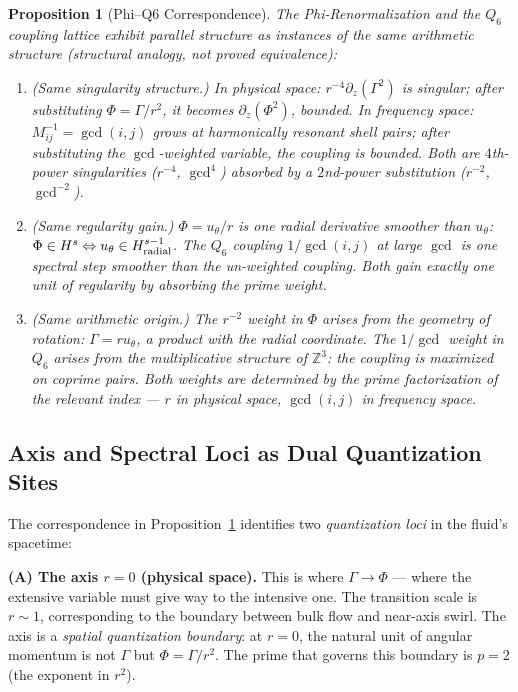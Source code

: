 \documentclass[11pt]{article}
\newtheorem{proposition}[theorem]{Proposition}
\begin{document}
\begin{proposition}[Phi--Q6 Correspondence]\label{prop:correspondence}
The Phi-Renormalization and the $Q_6$ coupling lattice exhibit parallel structure
as instances of the same arithmetic structure (structural analogy, not proved equivalence):
\begin{enumerate}[label=(\roman*)]
\item \textup{(Same singularity structure.)}
  In physical space: $r^{-4}\partial_z(\Gamma^2)$ is singular;
  after substituting $\Phi=\Gamma/r^2$, it becomes $\partial_z(\Phi^2)$, bounded.
  In frequency space: $M_{ij}^{-1}=\gcd(i,j)$ grows at harmonically
  resonant shell pairs; after substituting the $\gcd$-weighted variable,
  the coupling is bounded.
  Both are $4$th-power singularities ($r^{-4}$, $\gcd^4$) absorbed by a
  $2$nd-power substitution ($r^{-2}$, $\gcd^{-2}$).

\item \textup{(Same regularity gain.)}
  $\Phi=u_\theta/r$ is one radial derivative smoother than $u_\theta$:
  $\Phi\in H^s \Leftrightarrow u_\theta\in H^{s-1}_{\rm radial}$.
  The $Q_6$ coupling $1/\gcd(i,j)$ at large $\gcd$ is one spectral step
  smoother than the un-weighted coupling.
  Both gain exactly one unit of regularity by absorbing the prime weight.

\item \textup{(Same arithmetic origin.)}
  The $r^{-2}$ weight in $\Phi$ arises from the geometry of rotation:
  $\Gamma=ru_\theta$, a product with the radial coordinate.
  The $1/\gcd$ weight in $Q_6$ arises from the multiplicative structure
  of $\mathbb{Z}^3$: the coupling is maximized on coprime pairs.
  Both weights are determined by the prime factorization of the relevant index ---
  $r$ in physical space, $\gcd(i,j)$ in frequency space.
\end{enumerate}
\end{proposition}

\subsection{Axis and Spectral Loci as Dual Quantization Sites}

The correspondence in Proposition~\ref{prop:correspondence} identifies
two \emph{quantization loci} in the fluid's spacetime:

\medskip
\textbf{(A) The axis $r=0$ (physical space).}
This is where $\Gamma\to\Phi$ --- where the extensive variable must give
way to the intensive one. The transition scale is $r\sim 1$, corresponding
to the boundary between bulk flow and near-axis swirl.
The axis is a \emph{spatial quantization boundary}: at $r=0$, the
natural unit of angular momentum is not $\Gamma$ but $\Phi=\Gamma/r^2$.
The prime that governs this boundary is $p=2$ (the exponent in $r^2$).
\end{document}
